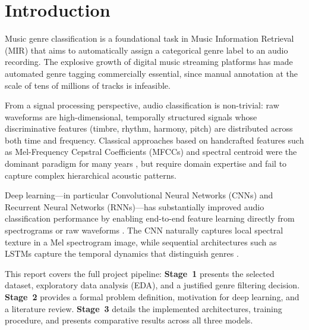 \documentclass[12pt, a4paper]{article}
\begin{document}
\tableofcontents
\thispagestyle{empty}
\newpage

\setcounter{page}{1}

\section{Introduction}
\label{sec:intro}

Music genre classification is a foundational task in Music Information Retrieval (MIR) that aims to automatically assign a categorical genre label to an audio recording. The explosive growth of digital music streaming platforms has made automated genre tagging commercially essential, since manual annotation at the scale of tens of millions of tracks is infeasible.

From a signal processing perspective, audio classification is non-trivial: raw waveforms
are high-dimensional, temporally structured signals whose discriminative features
(timbre, rhythm, harmony, pitch) are distributed across both time and frequency.
Classical approaches based on handcrafted features such as Mel-Frequency Cepstral
Coefficients (MFCCs) and spectral centroid were the dominant paradigm for many years
\citep{tzanetakis2002musical}, but require domain expertise and fail to capture complex
hierarchical acoustic patterns.

Deep learning---in particular Convolutional Neural Networks (CNNs) and Recurrent Neural
Networks (RNNs)---has substantially improved audio classification performance by enabling
end-to-end feature learning directly from spectrograms or raw waveforms
\citep{choi2017convolutional}. The CNN naturally captures local spectral texture in a
Mel spectrogram image, while sequential architectures such as LSTMs capture the temporal
dynamics that distinguish genres \citep{choi2017crnn}.

This report covers the full project pipeline: \textbf{Stage~1} presents the selected
dataset, exploratory data analysis (EDA), and a justified genre filtering decision.
\textbf{Stage~2} provides a formal problem definition, motivation for deep learning, and
a literature review. \textbf{Stage~3} details the implemented architectures, training
procedure, and presents comparative results across all three models.

\end{document}
